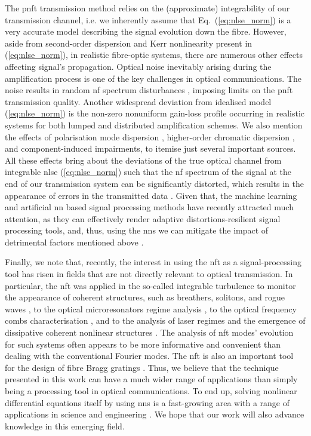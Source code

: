 The \acrshort{pnft} transmission method relies on the (approximate) integrability of our transmission channel, i.e. we inherently assume that Eq.~(\ref{eq:nlse_norm}) is a very accurate model describing the signal evolution down the fibre. However, aside from second-order dispersion and Kerr nonlinearity present in (\ref{eq:nlse_norm}), in realistic fibre-optic systems, there are numerous other effects affecting signal's propagation. Optical noise inevitably arising during the amplification process \cite{a12} is one of the key challenges in optical communications. The noise results in random \acrshort{nf} spectrum disturbances \cite{dpt16,pvd20}, imposing limits on the \acrshort{pnft} transmission quality.  Another widespread deviation from idealised model (\ref{eq:nlse_norm}) is the non-zero nonuniform gain-loss profile occurring in realistic systems for both lumped \cite{lpt15,kplt17_2} and distributed \cite{lpr15} amplification schemes. We also mention the effects of polarisation mode dispersion \cite{ylb17,ts19}, higher-order chromatic dispersion \cite{ylb17}, and component-induced impairments, to itemise just several important sources. All these effects bring about the deviations of the true optical channel from integrable \acrshort{nlse} (\ref{eq:nlse_norm}) such that the \acrshort{nf} spectrum of the signal at the end of our transmission system can be significantly distorted, which results in the appearance of errors in the transmitted data \cite{lpphet16,lab17,ylb17}.  Given that,  the machine learning and artificial \acrfull{nn} based signal processing methods have recently attracted much attention, as they can effectively render adaptive distortions-resilient signal processing tools, and, thus, using the \acrshort{nn}s we can mitigate the impact of detrimental factors mentioned above \cite{mrn18,kfl19}.  


Finally, we note that, recently, the interest in using the \acrshort{nft} as a signal-processing tool has risen in fields that are not directly relevant to optical transmission. In particular, the \acrshort{nft} was applied in the so-called integrable turbulence to monitor the appearance of coherent structures, such as breathers, solitons, and rogue waves \cite{rsc18,sda16}, to the optical microresonators regime analysis \cite{tcf20}, to the optical frequency combs characterisation \cite{wsh20}, and to the analysis of laser regimes and the emergence of dissipative coherent nonlinear structures \cite{rnb18,skp19,Chekhovskoy2019_PRL}. The analysis of \acrshort{nft} modes' evolution for such systems often appears to be more informative and convenient than dealing with the conventional Fourier modes. The \acrshort{nft} is also an important tool for the design of fibre Bragg gratings \cite{FBG01,FBG02}. Thus, we believe that the technique presented in this work can have a much wider range of applications than simply being a processing tool in optical communications. To end up, solving nonlinear differential equations itself by using \acrshort{nn}s is a fast-growing area with a range of applications in science and engineering \cite{rbp17,lkb18,lka20}. We hope that our work will also advance knowledge in this emerging field.

